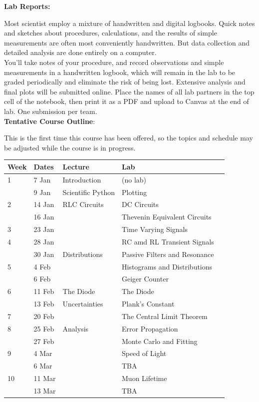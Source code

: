 \documentclass[12pt]{article}
\begin{document}
\noindent
\textbf {Lab Reports:} 

Most scientist employ a mixture of handwritten and digital logbooks.  Quick notes and sketches about procedures, calculations, and the results of simple measurements are often most conveniently handwritten.  But data collection and detailed analysis are done entirely on a computer.\\

You'll take notes of your procedure, and record observations and simple measurements in a handwritten logbook, which will remain in the lab to be graded periodically and eliminate the risk of being lost.  Extensive analysis and final plots will be submitted online.   Place the names of all lab partners in the top cell of the notebook, then print it as a PDF and upload to Canvas at the end of lab.  One submission per team.\\  

\noindent
\textbf {Tentative Course Outline}:

This is the first time this course has been offered, so the topics and schedule may be adjusted while the course is in progress.

\begin{table}[h!]
\normalsize %
\begin{tabular}{ lllll }
\hline
\textbf{Week} & \textbf{Dates} & \textbf{Lecture} & \textbf{Lab} \\
\hline
1 & 7 Jan & Introduction & (no lab) \\
   & 9 Jan & Scientific Python & Plotting\\
\hline
2 & 14 Jan & RLC Circuits & DC Circuits \\
  & 16 Jan & & Thevenin Equivalent Circuits \\
\hline
3 & 23 Jan & & Time Varying Signals \\
\hline
4 & 28 Jan & & RC amd RL Transient Signals \\
   & 30 Jan & Distributions &  Passive Filters and Resonance \\
\hline
5 & 4 Feb & & Histograms and Distributions\\
   & 6 Feb & & Geiger Counter\\
\hline
6 & 11 Feb & The Diode & The Diode \\
   & 13 Feb & Uncertainties & Plank's Constant \\
\hline
7 & 20 Feb & & The Central Limit Theorem \\
\hline
8 & 25 Feb & Analysis & Error Propagation \\
   & 27 Feb & & Monte Carlo and Fitting \\
\hline
9 & 4 Mar & & Speed of Light \\
   & 6 Mar & & TBA \\
\hline
10 & 11 Mar & & Muon Lifetime\\
   & 13 Mar & & TBA\\
\hline
\end{tabular} 
\end{table}
\end{document}
